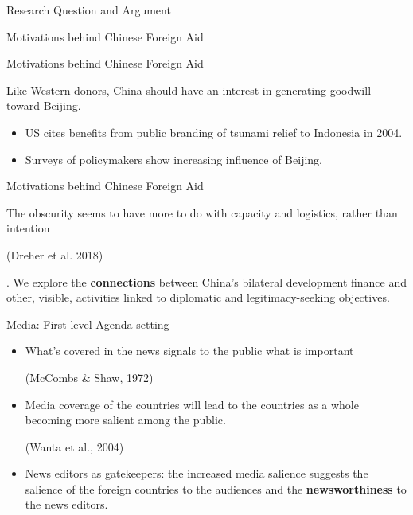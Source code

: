 \documentclass{beamer}
\begin{document}
\begin{frame}{Research Question and Argument}
\begin{frame}{Motivations behind Chinese Foreign Aid}
\end{frame}

\begin{frame}{Motivations behind Chinese Foreign Aid}

Like Western donors, China should have an interest in generating goodwill toward Beijing.

\begin{itemize}
    \item US cites benefits from public branding of tsunami relief to Indonesia in 2004.
    \item Surveys of policymakers show increasing influence of Beijing.
\end{itemize}

\end{frame}

\begin{frame}{Motivations behind Chinese Foreign Aid}

The obscurity seems to have more to do with capacity and logistics, rather than intention \begin{footnotesize} (Dreher et al. 2018) \end{footnotesize}. We
explore the \textbf{connections }between China’s bilateral development finance and other, visible,
activities linked to diplomatic and legitimacy-seeking objectives. 

\end{frame}

\begin{frame}{Media: First-level Agenda-setting}


\begin{itemize}
\item What's covered in the news signals to the public what is important \begin{footnotesize} (McCombs \& Shaw, 1972) \end{footnotesize}

\item Media coverage of the countries will lead to the countries as a whole becoming more
salient among the public. \begin{footnotesize} (Wanta et al., 2004) \end{footnotesize}

\item News editors as gatekeepers: the increased media salience suggests the salience of the foreign countries to the audiences and the \textbf{newsworthiness }to the news editors.
\end{itemize}


\end{frame}
\end{frame}
\end{document}
